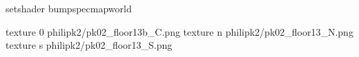 setshader bumpspecmapworld

texture 0 philipk2/pk02_floor13b_C.png
texture n philipk2/pk02_floor13_N.png
texture s philipk2/pk02_floor13_S.png

